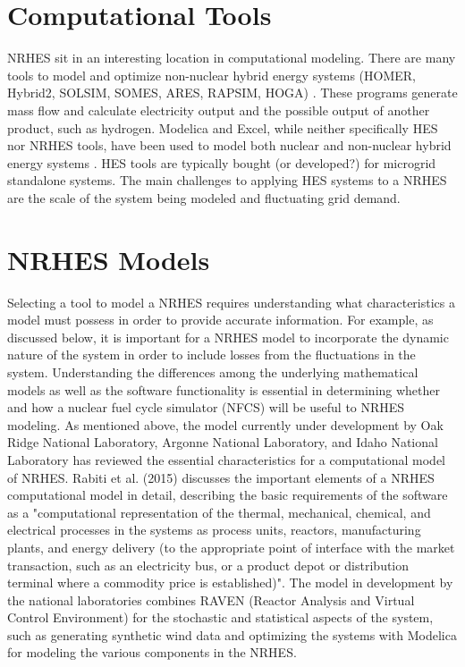 \documentclass[12pt]{UIdahoMastersThesis}
\begin{document}
\section{Computational Tools}
NRHES sit in an interesting location in computational modeling. There are many tools to model and optimize non-nuclear hybrid energy systems (HOMER, Hybrid2, SOLSIM, SOMES, ARES, RAPSIM, HOGA) \cite {Bernal-Agustin2009}. These programs generate mass flow and calculate electricity output and the possible output of another product, such as hydrogen. Modelica and Excel, while neither specifically HES nor NRHES tools, have been used to model both nuclear and non-nuclear hybrid energy systems \cite{Shropshire2012, Chen2016, Binder2014, Garcia2015, Epiney2016}. HES tools are typically bought (or developed?) for microgrid standalone systems. The main challenges to applying HES systems to a NRHES are the scale of the system being modeled and fluctuating grid demand.
\section{NRHES Models}
Selecting a tool to model a NRHES requires understanding what characteristics a model must possess in order to provide accurate information. For example, as discussed below, it is important for a NRHES model to incorporate the dynamic nature of the system in order to include losses from the fluctuations in the system. Understanding the differences among the underlying mathematical models as well as the software functionality is essential in determining whether and how a nuclear fuel cycle simulator (NFCS) will be useful to NRHES modeling. 
As mentioned above, the model currently under development by Oak Ridge National Laboratory, Argonne National Laboratory, and Idaho National Laboratory has reviewed the essential characteristics for a computational model of NRHES. Rabiti et al. (2015) discusses the important elements of a NRHES computational model in detail, describing the basic requirements of the software as a "computational representation of the thermal, mechanical, chemical, and electrical processes in the systems as process units, reactors, manufacturing plants, and energy delivery (to the appropriate point of interface with the market transaction, such as an electricity bus, or a product depot or distribution terminal where a commodity price is established)"\cite{Rabiti2015}. The model in development by the national laboratories combines RAVEN (Reactor Analysis and Virtual Control Environment) for the stochastic and statistical aspects of the system, such as generating synthetic wind data and optimizing the systems with Modelica for modeling the various components in the NRHES. 
\end{document}
